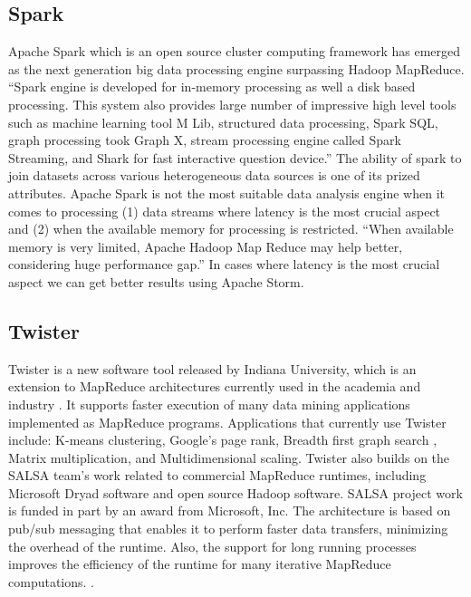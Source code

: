 \subsection{Spark \cite{www-spark}}

     Apache Spark which is an open source cluster computing framework
     has emerged as the next generation big data processing engine
     surpassing Hadoop MapReduce. ``Spark engine is developed for
     in-memory processing as well a disk based processing. This system
     also provides large number of impressive high level tools such as
     machine learning tool M Lib, structured data processing, Spark
     SQL, graph processing took Graph X, stream processing engine
     called Spark Streaming, and Shark for fast interactive question
     device.'' The ability of spark to join datasets across various
     heterogeneous data sources is one of its prized
     attributes. Apache Spark is not the most suitable data analysis
     engine when it comes to processing (1) data streams where latency
     is the most crucial aspect and (2) when the available memory for
     processing is restricted. ``When available memory is very limited,
     Apache Hadoop Map Reduce may help better, considering huge
     performance gap.'' In cases where latency is the most crucial
     aspect we can get better results using Apache Storm.
     
\subsection{Twister}

     Twister is a new software tool released by Indiana University,
     which is an extension to MapReduce architectures currently used
     in the academia and industry \cite{www-twister1}. It supports
     faster execution of many data mining applications implemented as
     MapReduce programs. Applications that currently use Twister
     include: K-means clustering, Google's page rank, Breadth first
     graph search , Matrix multiplication, and Multidimensional
     scaling. Twister also builds on the SALSA team's work related to
     commercial MapReduce runtimes, including Microsoft Dryad software
     and open source Hadoop software. SALSA project work is funded in
     part by an award from Microsoft, Inc. The architecture is based
     on pub/sub messaging that enables it to perform faster data
     transfers, minimizing the overhead of the runtime. Also, the
     support for long running processes improves the efficiency of the
     runtime for many iterative MapReduce
     computations. \cite{www-twister2} \cite{www-twister3}
     \cite{paper-twister}.

